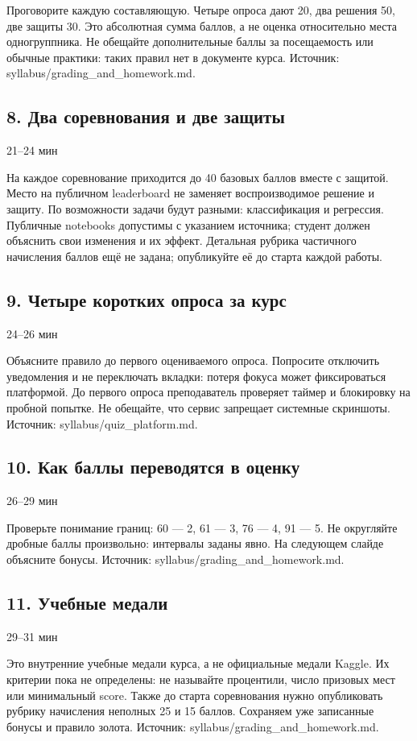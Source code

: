 \documentclass[11pt,a4paper]{article}
\newcommand{\timing}[1]{\hfill{\small\color{blue}#1}}
\begin{document}
Проговорите каждую составляющую. Четыре опроса дают 20, два решения 50, две защиты 30. Это абсолютная сумма баллов, а не оценка относительно места одногруппника. Не обещайте дополнительные баллы за посещаемость или обычные практики: таких правил нет в документе курса. Источник: syllabus/grading\_and\_homework.md.

\subsection{8. Два соревнования и две защиты}
\timing{21–24 мин}

На каждое соревнование приходится до 40 базовых баллов вместе с защитой. Место на публичном leaderboard не заменяет воспроизводимое решение и защиту. По возможности задачи будут разными: классификация и регрессия. Публичные notebooks допустимы с указанием источника; студент должен объяснить свои изменения и их эффект. Детальная рубрика частичного начисления баллов ещё не задана; опубликуйте её до старта каждой работы.

\subsection{9. Четыре коротких опроса за курс}
\timing{24–26 мин}

Объясните правило до первого оцениваемого опроса. Попросите отключить уведомления и не переключать вкладки: потеря фокуса может фиксироваться платформой. До первого опроса преподаватель проверяет таймер и блокировку на пробной попытке. Не обещайте, что сервис запрещает системные скриншоты. Источник: syllabus/quiz\_platform.md.

\subsection{10. Как баллы переводятся в оценку}
\timing{26–29 мин}

Проверьте понимание границ: 60 — 2, 61 — 3, 76 — 4, 91 — 5. Не округляйте дробные баллы произвольно: интервалы заданы явно. На следующем слайде объясните бонусы. Источник: syllabus/grading\_and\_homework.md.

\subsection{11. Учебные медали}
\timing{29–31 мин}

Это внутренние учебные медали курса, а не официальные медали Kaggle. Их критерии пока не определены: не называйте процентили, число призовых мест или минимальный score. Также до старта соревнования нужно опубликовать рубрику начисления неполных 25 и 15 баллов. Сохраняем уже записанные бонусы и правило золота. Источник: syllabus/grading\_and\_homework.md.
\end{document}
